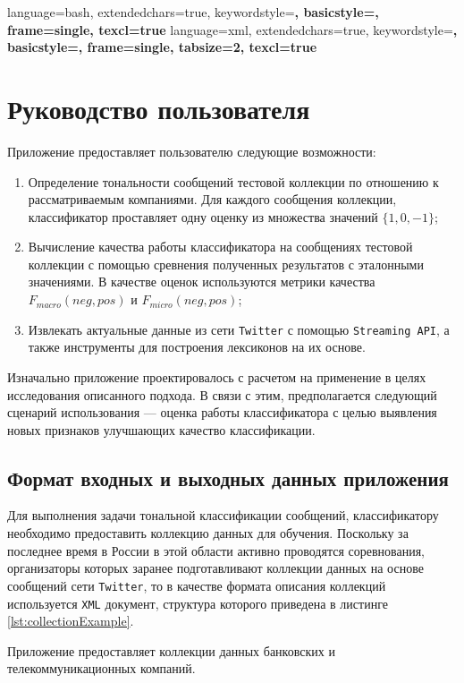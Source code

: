 {
    language=bash,
    extendedchars=true,
    keywordstyle=\bfseries,
    basicstyle=\footnotesize,
    frame=single,
    texcl=true
}
{
    language=xml,
    extendedchars=true,
    keywordstyle=\bfseries,
    basicstyle=\tiny,
    frame=single,
    tabsize=2,
    texcl=true
}


\section{Руководство пользователя}
Приложение предоставляет пользователю следующие возможности:
\begin{enumerate}
    \item Определение тональности сообщений тестовой коллекции по отношению к
    рассматриваемым компаниями. Для каждого сообщения коллекции, классификатор
    проставляет одну оценку из множества значений $\{1, 0, -1\}$;
    \item Вычисление качества работы классификатора на сообщениях тестовой
    коллекции с помощью сревнения полученных результатов с эталонными значениями.
    В качестве оценок используются метрики качества $F_{macro}(neg, pos)$ и
    $F_{micro}(neg, pos)$;
    \item Извлекать актуальные данные из сети {\tt Twitter} с помощью
    {\tt Streaming API}, а также инструменты для построения лексиконов на их
    основе.
\end{enumerate}
Изначально приложение проектировалось с расчетом на применение в целях
исследования описанного подхода. В связи с этим, предполагается следующий
сценарий использования --- оценка работы классификатора с целью выявления новых
признаков улучшающих качество классификации.
    \subsection{Формат входных и выходных данных приложения}
    Для выполнения задачи тональной классификации сообщений, классификатору
    необходимо предоставить коллекцию данных для обучения. Поскольку за последнее
    время в России в этой области активно проводятся соревнования, организаторы
    которых заранее подготавливают коллекции данных на основе сообщений сети
    {\tt Twitter}, то в качестве формата описания коллекций
    используется {\tt XML} документ, структура которого приведена в листинге \ref{lst:collectionExample}.
    \lstset{style=xml}
    
    Приложение предоставляет коллекции данных банковских и телекоммуникационных
    компаний.

